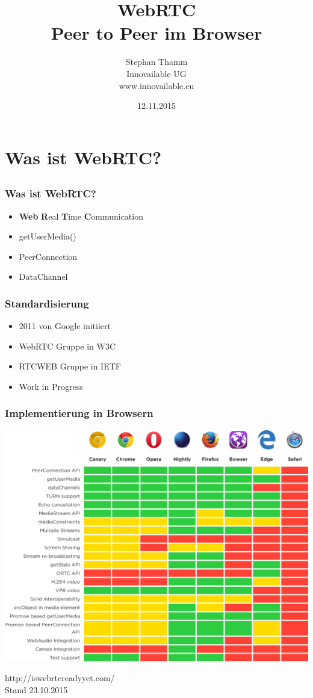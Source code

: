 \documentclass[12pt]{beamer}
\title{\huge WebRTC \\ \small Peer to Peer im Browser}
\author{Stephan Thamm \\ Innovailable UG \\ www.innovailable.eu}
\date{12.11.2015}
\begin{document}
\maketitle

\frame{\tableofcontents[sections={1-4}]}


\section{Was ist WebRTC?}
\subsection{} 

\begin{frame}
  \frametitle{Was ist WebRTC?}
  \begin{itemize}
    \item<2-> \textbf{Web} \textbf{R}eal \textbf{T}ime \textbf{C}ommunication
    \item<3-> getUserMedia()
    \item<4-> PeerConnection
    \item<5-> DataChannel
  \end{itemize}
\end{frame}

\begin{frame}
  \frametitle{Standardisierung}
  \begin{itemize}
    \item<2-> 2011 von Google initiiert
    \item<3-> WebRTC Gruppe in W3C
    \item<4-> RTCWEB Gruppe in IETF
    \item<5-> Work in Progress
  \end{itemize}
\end{frame}

\begin{frame}
  \frametitle{Implementierung in Browsern}
  \pause
  \centerline{\includegraphics[height=0.7\textheight]{img/webrtc_ready.png}}
  \hfill \tiny http://iswebrtcreadyyet.com/ \\
  \hfill \tiny Stand 23.10.2015
\end{frame}
\end{document}
